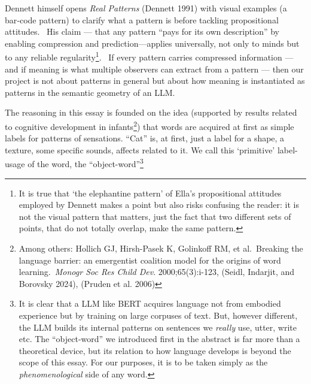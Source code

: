 \documentclass[12pt]{article}
\begin{document}
Dennett himself opens \emph{Real Patterns} (Dennett 1991) with visual examples (a bar‑code pattern) to clarify what a pattern is before tackling propositional attitudes.~ His claim --- that any pattern ``pays for its own description'' by enabling compression and prediction---applies universally, not only to minds but to any reliable regularity\footnote{It is true that `the elephantine pattern' of Ella's propositional attitudes employed by Dennett makes a point but also risks confusing the reader: it is not the visual pattern that matters, just the fact that two different sets of points, that do not totally overlap, make the same pattern.}.~ If every pattern carries compressed information --- and if meaning is what multiple observers can extract from a pattern --- then our project is not about patterns in general but about how meaning is instantiated as patterns in the semantic geometry of an LLM.

The reasoning in this essay is founded on the idea (supported by results related to cognitive development in infants\footnote{Among others: Hollich GJ, Hirsh-Pasek K, Golinkoff RM, et al.~Breaking the language barrier: an emergentist coalition model for the origins of word learning.~\emph{Monogr Soc Res Child Dev}. 2000;65(3):i-123, (Seidl, Indarjit, and Borovsky 2024), (Pruden et al. 2006)}) that words are acquired at first as simple labels for patterns of sensations. ``Cat'' is, at first, just a label for a shape, a texture, some specific sounds, affects related to it. We call this `primitive' label-usage of the word, the ``object-word''\footnote{It is clear that a LLM like BERT acquires language not from embodied experience but by training on large corpuses of text. But, however different, the LLM builds its internal patterns on sentences we \emph{really} use, utter, write etc. The ``object-word'' we introduced first in the abstract is far more than a theoretical device, but its relation to how language develops is beyond the scope of this essay. For our purposes, it is to be taken simply as the \emph{phenomenological} side of any word.}
\end{document}
